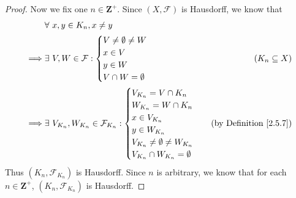 \begin{proof}
    Now we fix one \(n \in \mathbf{Z}^+\).
    Since \((X, \mathcal{F})\) is Hausdorff, we know that
    \begin{align*}
                 & \forall\ x, y \in K_n, x \neq y                                                                                    \\
        \implies & \exists\ V, W \in \mathcal{F} : \begin{cases}
            V \neq \emptyset \neq W \\
            x \in V                 \\
            y \in W                 \\
            V \cap W = \emptyset
        \end{cases}                   & (K_n \subseteq X)                  \\
        \implies & \exists\ V_{K_n}, W_{K_n} \in \mathcal{F}_{K_n} : \begin{cases}
            V_{K_n} = V \cap K_n                \\
            W_{K_n} = W \cap K_n                \\
            x \in V_{K_n}                       \\
            y \in W_{K_n}                       \\
            V_{K_n} \neq \emptyset \neq W_{K_n} \\
            V_{K_n} \cap W_{K_n} = \emptyset
        \end{cases} & \text{(by Definition \ref{2.5.7})}
    \end{align*}
    Thus \((K_n, \mathcal{F}_{K_n})\) is Hausdorff.
    Since \(n\) is arbitrary, we know that for each \(n \in \mathbf{Z}^+\), \((K_n, \mathcal{F}_{K_n})\) is Hausdorff.


\end{proof}
